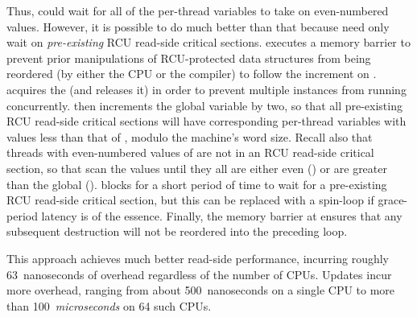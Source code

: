 \begin{fcvref}
Thus,  could wait for all of the per-thread
 variables to take on even-numbered values.
However, it is possible to do much better than that because
 need only wait on \emph{pre-existing}
RCU read-side critical sections.
 executes a memory barrier to prevent prior manipulations
of RCU-protected data structures from being reordered (by either
the CPU or the compiler) to follow the increment on
.
 acquires the 
(and  releases it)
in order to prevent multiple
 instances from running concurrently.
 then increments the global  variable by
two, so that all pre-existing RCU read-side critical sections will
have corresponding per-thread  variables with
values less than that of , modulo the machine's
word size.
Recall also that threads with even-numbered values of 
are not in an RCU read-side critical section,
so that 
scan the  values until they
all are either even () or are greater than the global
 ().
 blocks for a short period of time to wait for a
pre-existing RCU read-side critical section, but this can be replaced with
a spin-loop if grace-period latency is of the essence.
Finally, the memory barrier at  ensures that any subsequent
destruction will not be reordered into the preceding loop.
\end{fcvref}

\QuickQuizEnd

This approach achieves much better read-side performance, incurring
roughly 63~nanoseconds of overhead regardless of the number of
 CPUs.
Updates incur more overhead, ranging from about 500~nanoseconds on
a single  CPU to more than 100~\emph{microseconds} on 64
such CPUs.

